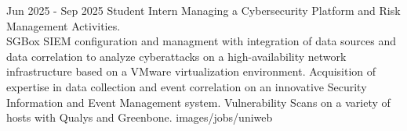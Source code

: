 {Jun 2025 - Sep 2025}
{Student Intern}
{Managing a Cybersecurity Platform and Risk Management Activities.\\
SGBox SIEM configuration and managment with integration of data sources 
and data correlation to analyze cyberattacks on a high-availability 
network infrastructure based on a VMware virtualization environment.
Acquisition of expertise in data collection and event correlation on an innovative 
Security Information and Event Management system.
Vulnerability Scans on a variety of hosts with Qualys and Greenbone.}
{images/jobs/uniweb}
